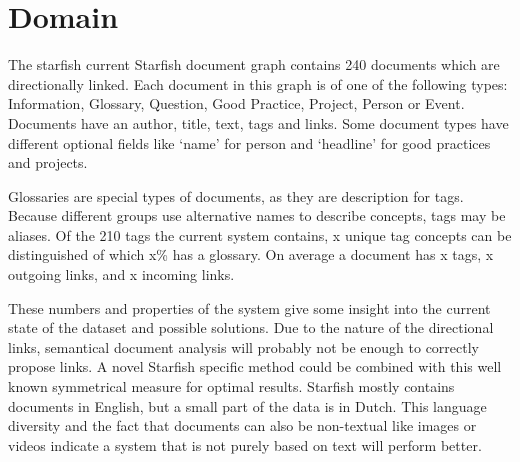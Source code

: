 

\section{Domain}
The starfish current Starfish document graph contains 240 documents which are directionally linked. Each document in this graph is of one of the following types: Information, Glossary, Question, Good Practice, Project, Person or Event. Documents have an author, title, text, tags and links. Some document types have different optional fields like `name' for person and `headline' for good practices and projects. 

Glossaries are special types of documents, as they are description for tags. Because different groups use alternative names to describe concepts, tags may be aliases. Of the 210 tags the current system contains, x unique tag concepts can be distinguished of which x\% has a glossary. On average a document has x tags, x outgoing links, and x incoming links.

These numbers and properties of the system give some insight into the current state of the dataset and possible solutions. Due to the nature of the directional links, semantical document analysis will probably not be enough to correctly propose links. A novel Starfish specific method could be combined with this well known symmetrical measure for optimal results. Starfish mostly contains documents in English, but a small part of the data is in Dutch. This language diversity and the fact that documents can also be non-textual like images or videos indicate a system that is not purely based on text will perform better.